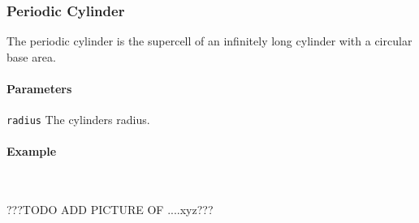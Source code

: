 \subsubsection{Periodic Cylinder}
The periodic cylinder is the supercell of an infinitely long cylinder with a circular base area.

\paragraph{Parameters}
\begin{description}
 \item{\lstinline{radius}} The cylinders radius.
\end{description}

\paragraph{Example}\ 


???TODO ADD PICTURE OF ....xyz???